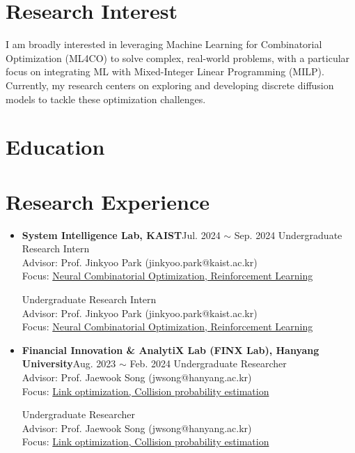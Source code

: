 \documentclass[11pt,a4paper]{moderncv}
\newcommand*{\entrybullet}{{\tiny\faCircle[regular]}}
\newlength{\entryindent}
\newenvironment{cvlist}%
  {\vspace{-3.4pt}%
   \begin{itemize}[label=\hspace{-0.5pt}\entrybullet, leftmargin=\entryindent,
                   labelsep=0pt, labelwidth=\entryindent, align=left,
                   topsep=0pt, partopsep=0pt, parsep=0pt, itemsep=5.9pt]\small}%
  {\end{itemize}\vspace{-2.5pt}}
\newcommand{\cvevent}[3]{%
  \item \textbf{#1}\hfill #2%
  \ifx\relax#3\relax\else\par #3\fi}
\newcommand{\ul}[1]{\underline{#1}\rule[-5.4pt]{0pt}{0pt}}
\begin{document}
\vspace*{-19pt}
\makecvtitle
\vspace{-32pt}

\section{Research Interest}
I am broadly interested in leveraging Machine Learning for Combinatorial Optimization (ML4CO)
to solve complex, real-world problems, with a particular focus on integrating ML with
Mixed-Integer Linear Programming (MILP). Currently, my research centers on exploring and
developing discrete diffusion models to tackle these optimization challenges.

\section{Education}
\vspace{3pt}
\vspace{-8.1pt}

\section{Research Experience}
\begin{cvlist}
\cvevent{System Intelligence Lab, KAIST}{Jul. 2024 $\sim$ Sep. 2024}{%
  Undergraduate Research Intern\\
  Advisor: Prof. Jinkyoo Park (jinkyoo.park@kaist.ac.kr)\\
  Focus: \ul{Neural Combinatorial Optimization, Reinforcement Learning}}

\cvevent{Financial Innovation \& AnalytiX Lab (FINX Lab), Hanyang University}{Aug. 2023 $\sim$ Feb. 2024}{%
  Undergraduate Researcher\\
  Advisor: Prof. Jaewook Song (jwsong@hanyang.ac.kr)\\
  Focus: \ul{Link optimization, Collision probability estimation}}
\end{cvlist}
\end{document}
